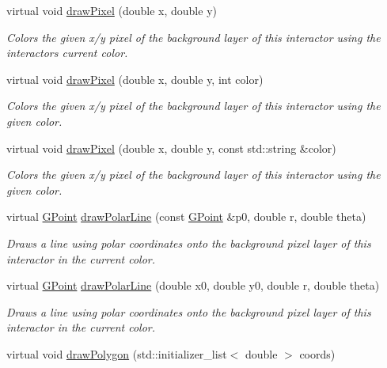 \begin{DoxyCompactItemize}
virtual void \mbox{\hyperlink{classsgl_1_1GDrawingSurface_a0c1e2923d8d163d62d0896d8c5cfa191}{draw\+Pixel}} (double x, double y)
\begin{DoxyCompactList}\small\item\em Colors the given x/y pixel of the background layer of this interactor using the interactor\textquotesingle{}s current color. \end{DoxyCompactList}\item 
virtual void \mbox{\hyperlink{classsgl_1_1GDrawingSurface_a3a64eb6383e601be8438e9c71643c432}{draw\+Pixel}} (double x, double y, int color)
\begin{DoxyCompactList}\small\item\em Colors the given x/y pixel of the background layer of this interactor using the given color. \end{DoxyCompactList}\item 
virtual void \mbox{\hyperlink{classsgl_1_1GDrawingSurface_a20abc26a94b7eb310e34abf668e0f5f4}{draw\+Pixel}} (double x, double y, const std\+::string \&color)
\begin{DoxyCompactList}\small\item\em Colors the given x/y pixel of the background layer of this interactor using the given color. \end{DoxyCompactList}\item 
virtual \mbox{\hyperlink{structsgl_1_1GPoint}{G\+Point}} \mbox{\hyperlink{classsgl_1_1GDrawingSurface_af70cce1e4f708f1ed5b6f29cecb660e7}{draw\+Polar\+Line}} (const \mbox{\hyperlink{structsgl_1_1GPoint}{G\+Point}} \&p0, double r, double theta)
\begin{DoxyCompactList}\small\item\em Draws a line using polar coordinates onto the background pixel layer of this interactor in the current color. \end{DoxyCompactList}\item 
virtual \mbox{\hyperlink{structsgl_1_1GPoint}{G\+Point}} \mbox{\hyperlink{classsgl_1_1GDrawingSurface_ad3e646f90005295f2bbdf37d2bcb39d2}{draw\+Polar\+Line}} (double x0, double y0, double r, double theta)
\begin{DoxyCompactList}\small\item\em Draws a line using polar coordinates onto the background pixel layer of this interactor in the current color. \end{DoxyCompactList}\item 
virtual void \mbox{\hyperlink{classsgl_1_1GDrawingSurface_afddec0a905108d8a8d6809a157f26776}{draw\+Polygon}} (std\+::initializer\+\_\+list$<$ double $>$ coords)

\end{DoxyCompactItemize}
